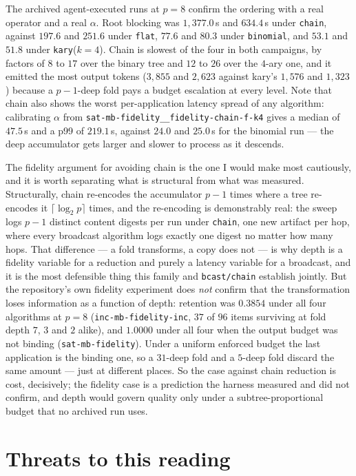 \documentclass[11pt]{article}
\begin{document}
The archived agent-executed runs at $p=8$ confirm the ordering with a real operator and a real
$\alpha$. Root blocking was $1{,}377.0$\,s and $634.4$\,s under \texttt{chain}, against $197.6$
and $251.6$ under \texttt{flat}, $77.6$ and $80.3$ under \texttt{binomial}, and $53.1$ and
$51.8$ under \texttt{kary}($k{=}4$). Chain is slowest of the four in both campaigns, by factors
of $8$ to $17$ over the binary tree and $12$ to $26$ over the $4$-ary one, and it emitted the
most output tokens ($3{,}855$ and $2{,}623$ against kary's $1{,}576$ and $1{,}323$) because a
$p-1$-deep fold pays a budget escalation at every level. Note that chain also shows the worst
per-application latency spread of any algorithm: calibrating $\alpha$ from
\texttt{sat-mb-fidelity\_\_fidelity-chain-f-k4} gives a median of $47.5$\,s and a p99 of
$219.1$\,s, against $24.0$ and $25.0$\,s for the binomial run --- the deep accumulator gets
larger and slower to process as it descends.

The fidelity argument for avoiding chain is the one I would make most cautiously, and it is
worth separating what is structural from what was measured. Structurally, chain re-encodes the
accumulator $p-1$ times where a tree re-encodes it $\lceil\log_2 p\rceil$ times, and the
re-encoding is demonstrably real: the sweep logs $p-1$ distinct content digests per run under
\texttt{chain}, one new artifact per hop, where every broadcast algorithm logs exactly one
digest no matter how many hops. That difference --- a fold transforms, a copy does not --- is
why depth is a fidelity variable for a reduction and purely a latency variable for a broadcast,
and it is the most defensible thing this family and \texttt{bcast/chain} establish jointly. But
the repository's own fidelity experiment does \emph{not} confirm that the transformation loses
information as a function of depth: retention was $0.3854$ under all four algorithms at $p=8$
(\texttt{inc-mb-fidelity-inc}, $37$ of $96$ items surviving at fold depth $7$, $3$ and $2$
alike), and $1.0000$ under all four when the output budget was not binding
(\texttt{sat-mb-fidelity}). Under a uniform enforced budget the last application is the binding one, so a
$31$-deep fold and a $5$-deep fold discard the same amount --- just at different places. So the
case against chain reduction is cost, decisively; the fidelity case is a prediction the harness
measured and did not confirm, and depth would govern quality only under a
subtree-proportional budget that no archived run uses.

\section{Threats to this reading}
\end{document}
